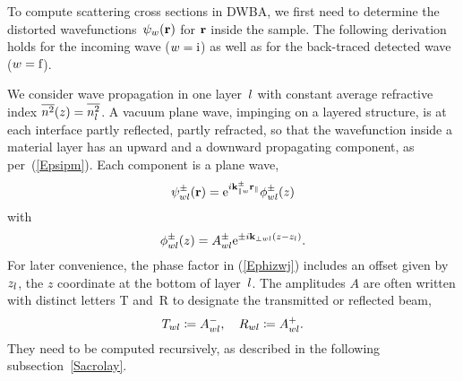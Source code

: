 %

To compute scattering cross sections in DWBA,
we first need to determine the distorted wavefunctions~$\psi_w(\mathbf{r})$
for $\mathbf{r}$ inside the sample.
The following derivation holds for the incoming wave ($w=\text{i}$)
as well as for the back-traced detected wave ($w=\text{f}$).

We consider wave propagation in one layer~$l$
%
with constant average refractive index $\overline{n^2}(z)=\overline{n_l^2}$.
A vacuum plane wave, impinging on a layered structure,
is at each interface partly reflected, partly refracted,
so that the wavefunction inside a material layer
has an upward and a downward propagating component,
as per~(\ref{Epsipm}).
Each component is a plane wave,
\begin{equation}
  \psi^\pm_{wl}(\mathbf{r})=\text{e}^{i\mathbf{k}^\pm_{\parallel w}\mathbf{r}_\parallel}\phi^\pm_{wl}(z)
\end{equation}
with
\begin{equation}\label{Ephizwj}
  \phi^\pm_{wl}(z)=A^\pm_{wl}\text{e}^{\pm i\mathbf{k}_{\perp wl}(z-z_l)}.
\end{equation}
%
For later convenience,
the phase factor in (\ref{Ephizwj}) includes an offset
given by~$z_l$, the $z$ coordinate at the bottom of layer~$l$.
The amplitudes $A$ are often written with distinct letters
T and~R to designate the transmitted or reflected beam,
\begin{equation}
  T_{wl} \coloneqq  A^-_{wl},\quad
  R_{wl} \coloneqq  A^+_{wl}.
\end{equation}
%
%
They need to be computed recursively,
as described in the following subsection~\ref{Sacrolay}.

